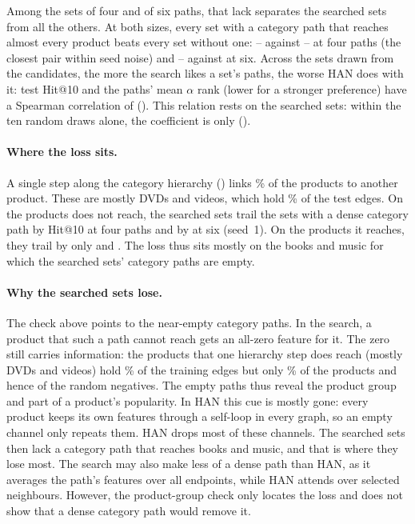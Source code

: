 

Among the sets of four and of six paths, that lack separates the searched sets from all the others.
At both sizes, every set with a category path that reaches almost every product beats every set
without one: -- against
-- at four paths (the closest pair within seed noise)
and -- against  at six. Across the
 sets drawn from the candidates, the more the search likes a set's paths, the
worse HAN does with it: test Hit@10 and the paths' mean $\alpha$ rank (lower for a stronger
preference) have a Spearman correlation of  (). This relation
rests on the searched sets: within the ten random draws alone, the coefficient is only
 ().

\paragraph{Where the loss sits.} A single step along the category hierarchy () links
\% of the products to another product. These are mostly DVDs and
videos, which hold \% of the test edges. On the products 
does not reach, the searched sets trail the sets with a dense category path by 
Hit@10 at four paths and by  at six (seed~1). On the products it reaches, they
trail by only  and . The loss thus sits mostly on the
books and music for which the searched sets' category paths are empty.

\paragraph{Why the searched sets lose.} The check above points to the near-empty category paths. In
the search, a product that such a path cannot reach gets an all-zero feature for it. The zero still
carries information: the products that one hierarchy step does reach (mostly DVDs and videos) hold
\% of the training edges but only \% of
the products and hence of the random negatives. The empty paths thus reveal the product group and
part of a product's popularity. In HAN this cue is mostly gone: every product keeps its own features
through a self-loop in every graph, so an empty channel only repeats them. HAN drops most of these
channels. The searched sets then lack a category path that reaches books and music, and that is
where they lose most. The search may also make less of a dense path than HAN, as it averages the
path's features over all endpoints, while HAN attends over  selected neighbours.
However, the product-group check only locates the loss and does not show that a dense category path
would remove it.

